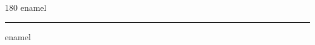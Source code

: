 
\begin{frame}
\begin{center}
\begin{turn}{180}
{\fontsize{2.5cm}{1em}\selectfont enamel}
\end{turn}
\vspace{1em}\par  
\hrule
\vspace{1em}\par  
{\fontsize{2.5cm}{1em}\selectfont enamel}
\end{center}
\end{frame}
